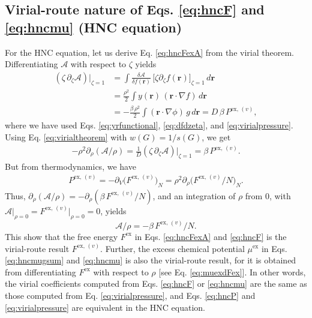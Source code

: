 \documentclass[preprint]{revtex4-1}
\newcommand{\vct}[1]{\mathbf{#1}}
\providecommand{\vr}{} %
\renewcommand{\vr}{\vct{r}}
\newcommand{\supex}[1]{ { { #1 }^{ \mathrm{ex} } } }
\newcommand{\supexv}[1]{ { { #1 }^{ \mathrm{ex}, \, (v) } } }
\newcommand{\Pexv}{\supexv{P}}
\newcommand{\Fex}{\supex{F}}
\newcommand{\Fexv}{\supexv{F}}
\newcommand{\muex}{\supex{\mu}}
\newcommand{\A}{\mathcal{A}}
\begin{document}
\subsection{\label{sec:vthnc}Virial-route nature of
Eqs. \eqref{eq:hncF} and \eqref{eq:hncmu} (HNC equation)}

For the HNC equation,
let us derive Eq. \eqref{eq:hncFexA} from the virial theorem.
%
Differentiating $\A$ with respect to $\zeta$ yields
\begin{align*}
  (\zeta \, \partial_\zeta \A) \big|_{\zeta = 1}
&=
  \int \frac{ \delta \A } { \delta f(\vr) } \,
  \big[ \zeta \partial_\zeta f(\vr) \big]_{\zeta = 1} \, d\vr
  \\
&=
  \frac{\rho^2}{2}
  \int y(\vr) \,
  (\vr \cdot \nabla f) \, d\vr
  \\
&=
  -\frac{ \beta \, \rho^2}{2}
  \int (\vr \cdot \nabla \phi) \, g \, d\vr
= D \, \beta \, \Pexv,
\end{align*}
where we have used Eqs. \eqref{eq:yrfunctional},
\eqref{eq:dfdzeta}, and \eqref{eq:virialpressure}.
%
Using Eq. \eqref{eq:virialtheorem}
with $w(G) = 1/s(G)$, we get
\begin{align*}
  -\rho^2 \partial_\rho ( \A/\rho )
=
  \frac{1}{D} (\zeta \, \partial_\zeta \A) \big|_{\zeta = 1}
=
  \beta \, \Pexv.
\end{align*}
%
But from thermodynamics, we have
\begin{align*}
  \Pexv
=
  -\partial_V \bigl( \Fexv \bigr)_N
=
  \rho^2 \partial_\rho \bigl( \Fexv/N \bigr)_N.
\end{align*}
%
Thus,
$\partial_\rho (\A/\rho)  = -\partial_\rho( \beta \, \Fexv/N )$,
and an integration of $\rho$ from 0,
with $\A \big|_{\rho = 0} = \Fexv \big|_{\rho = 0} = 0$, yields
\[
  \A/\rho = -\beta \, \Fexv/N.
\]
This show that the free energy $\Fex$ in
Eqs. \eqref{eq:hncFexA} and \eqref{eq:hncF}
is the virial-route result $\Fexv$.
%
%
Further, the excess chemical potential
$\muex$ in Eqs. \eqref{eq:hncmugsum} and \eqref{eq:hncmu}
is also the virial-route result,
for it is obtained from differentiating $\Fex$
with respect to $\rho$
[see Eq. \eqref{eq:muexdFex}].
%
In other words,
the virial coefficients computed from
Eqs. \eqref{eq:hncF} or \eqref{eq:hncmu}
are the same as those computed from
Eq. \eqref{eq:virialpressure},
and Eqs. \eqref{eq:hncP} and \eqref{eq:virialpressure}
are equivalent in the HNC equation.
\end{document}
